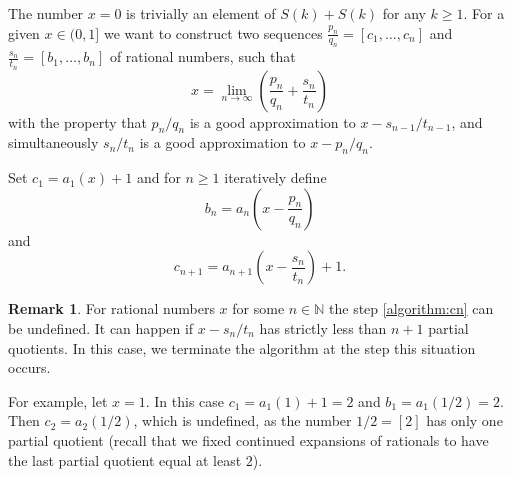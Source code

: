 \documentclass{amsart}
\theoremstyle{definition}
\newtheorem{remark}[theorem]{Remark}
\newcommand{\N}{\mathbb N}%
\newcommand{\0}{\mbf 0}%
\def\N{\mathbb N}
\begin{document}
The number $x=0$ is trivially an element of $S(k)+S(k)$ for any $k\geq1$. For a given $x\in(0,1]$ we want to construct two sequences $\frac{p_n}{q_n}=[c_1,\ldots,c_n]$ and $\frac{s_n}{t_n}=[b_1,\ldots,b_n]$ of rational numbers, such that 
$$x=\lim_{n\to\infty} \left( \frac{p_n}{q_n} + \frac{s_n}{t_n} \right)$$
with the property that $p_n/q_n$ is a good approximation to $x- s_{n-1}/t_{n-1}$, and simultaneously $s_n/t_n$ is a good approximation to $x-p_n/q_n$.











Set $c_1  = a_1(x)+1$ and for $n\geq1$ iteratively define
\begin{equation}\label{algorithm:bn}
b_n = a_n \left(    x - \frac{p_n}{q_n}  \right)
\end{equation}
and
\begin{equation}\label{algorithm:cn}
c_{n+1} = a_{n+1} \left(    x - \frac{s_n}{t_n}  \right)  +1.
\end{equation}

\begin{remark}\label{remark:rational:termination}
For rational numbers $x$ for some $n\in\N$ the step  \eqref{algorithm:cn} can be undefined. It can happen if $x-s_n/t_n$ has strictly less than $n+1$ partial quotients. In this case, we terminate the algorithm at the step this situation occurs.

For example, let $x=1$. In this case $c_1=a_1(1)+1 = 2$ and $b_1 = a_1(1/2) = 2$. Then $c_2 = a_2(1/2)$, which is undefined, as the number $1/2=[2]$ has only one partial quotient (recall that we fixed continued expansions of rationals to have the last partial quotient equal at least $2$). 
\end{remark}
\end{document}
